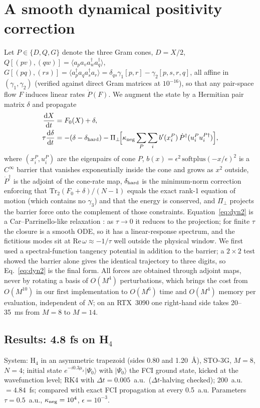 \documentclass[aip,jcp,reprint,floatfix,superscriptaddress]{revtex4-2}
\newcommand{\Tr}{\mathrm{Tr}}
\newcommand{\dd}{\mathrm{d}}
\newcommand{\ad}{a^\dagger}
\begin{document}
\section{A smooth dynamical positivity correction}\label{sec:delta}
Let $P\in\{D,Q,G\}$ denote the three Gram cones,
$D=X/2$, $Q[(pv),(qw)]=\langle a_pa_va^\dagger_wa^\dagger_q\rangle$, $G[(pq),(rs)]=\langle\ad_pa_q\ad_sa_r\rangle=\delta_{qs}\gamma_1[p,r]-\gamma_2[p,s,r,q]$, all affine in $(\gamma_1,\gamma_2)$ (verified against direct Gram matrices at $10^{-16}$), so that any pair-space flow $F$ induces linear rates $\dot P(F)$. We augment the state by a Hermitian pair matrix $\delta$ and propagate
\begin{align}
\frac{\dd X}{\dd t}&=F_0(X)+\delta,\label{eq:dyn1}\\
\tau\frac{\dd\delta}{\dd t}&=-(\delta-\delta_{\rm hard})-\Pi_\perp\!\Big[\kappa_{\rm neg}\sum_P\sum_i b'(x_i^P)\,\dot P^\dagger(u_i^Pu_i^{P\dagger})\Big],\label{eq:dyn2}
\end{align}
where $(x_i^P,u_i^P)$ are the eigenpairs of cone $P$, $b(x)=\epsilon^2\,\mathrm{softplus}(-x/\epsilon)^2$ is a $C^\infty$ barrier that vanishes exponentially inside the cone and grows as $x^2$ outside, $\dot P^\dagger$ is the adjoint of the cone-rate map, $\delta_{\rm hard}$ is the minimum-norm correction enforcing that $\Tr_2(F_0+\delta)/(N-1)$ equals the exact rank-1 equation of motion (which contains no $\gamma_3$) and that the energy is conserved, and $\Pi_\perp$ projects the barrier force onto the complement of those constraints. Equation~\eqref{eq:dyn2} is a Car--Parrinello-like relaxation \cite{car1985}: as $\tau\to0$ it reduces to the projection; for finite $\tau$ the closure is a smooth ODE, so it has a linear-response spectrum, and the fictitious modes sit at $\mathrm{Re}\,\omega\approx-1/\tau$ well outside the physical window. We first used a spectral-function tangency potential in addition to the barrier; a $2\times2$ test showed the barrier alone gives the identical trajectory to three digits, so Eq.~\eqref{eq:dyn2} is the final form. All forces are obtained through adjoint maps, never by rotating a basis of $O(M^4)$ perturbations, which brings the cost from $O(M^{10})$ in our first implementation to $O(M^6)$ time and $O(M^4)$ memory per evaluation, independent of $N$; on an RTX~3090 one right-hand side takes 20--35~ms from $M=8$ to $M=14$.

\subsection{Results: 4.8 fs on H$_4$}
System: H$_4$ in an asymmetric trapezoid (sides 0.80 and 1.20~\AA), STO-3G, $M=8$, $N=4$; initial state $e^{-i0.3\mu_x}|\Psi_0\rangle$ with $|\Psi_0\rangle$ the FCI ground state, kicked at the wavefunction level; RK4 with $\Delta t=0.005$~a.u.\ ($\Delta t$-halving checked); 200~a.u.~$=4.84$~fs; compared with exact FCI propagation at every 0.5~a.u. Parameters $\tau=0.5$~a.u., $\kappa_{\rm neg}=10^4$, $\epsilon=10^{-3}$.
\end{document}
